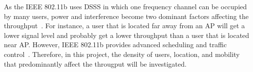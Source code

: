 As the IEEE 802.11b uses DSSS in which one frequency channel can be occupied by many users, power and interference become two dominant factors affecting the throughput~\cite{kemerlis2006throughput}. For instance, a user that is located far away from an AP will get a lower signal level and probably get a lower throughput than a user that is located near AP. However, IEEE 802.11b provides advanced scheduling and traffic control~\cite{bianchi2000performance}. Therefore, in this project, the density of users, location, and mobility that predominantly affect the througput will be investigated.